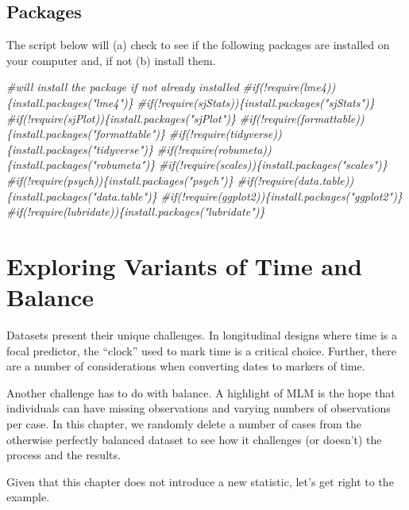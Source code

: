 \documentclass[
  11pt,
]{book}
\newenvironment{Shaded}{\begin{snugshade}}{\end{snugshade}}
\newcommand{\CommentTok}[1]{\textcolor[rgb]{0.56,0.35,0.01}{\textit{#1}}}
\begin{document}
\hypertarget{packages-4}{%
\subsection{Packages}\label{packages-4}}

The script below will (a) check to see if the following packages are installed on your computer and, if not (b) install them.

\begin{Shaded}
\begin{Highlighting}[]
\CommentTok{\#will install the package if not already installed}
\CommentTok{\#if(!require(lme4))\{install.packages("lme4")\}}
\CommentTok{\#if(!require(sjStats))\{install.packages("sjStats")\}}
\CommentTok{\#if(!require(sjPlot))\{install.packages("sjPlot")\}}
\CommentTok{\#if(!require(formattable))\{install.packages("formattable")\}}
\CommentTok{\#if(!require(tidyverse))\{install.packages("tidyverse")\}}
\CommentTok{\#if(!require(robumeta))\{install.packages("robumeta")\}}
\CommentTok{\#if(!require(scales))\{install.packages("scales")\}}
\CommentTok{\#if(!require(psych))\{install.packages("psych")\}}
\CommentTok{\#if(!require(data.table))\{install.packages("data.table")\}}
\CommentTok{\#if(!require(ggplot2))\{install.packages("ggplot2")\}}
\CommentTok{\#if(!require(lubridate))\{install.packages("lubridate")\}}
\end{Highlighting}
\end{Shaded}

\hypertarget{exploring-variants-of-time-and-balance}{%
\section{Exploring Variants of Time and Balance}\label{exploring-variants-of-time-and-balance}}

Datasets present their unique challenges. In longitudinal designs where time is a focal predictor, the ``clock'' used to mark time is a critical choice. Further, there are a number of considerations when converting dates to markers of time.

Another challenge has to do with balance. A highlight of MLM is the hope that individuals can have missing observations and varying numbers of observations per case. In this chapter, we randomly delete a number of cases from the otherwise perfectly balanced dataset to see how it challenges (or doesn't) the process and the results.

Given that this chapter does not introduce a new statistic, let's get right to the example.
\end{document}
